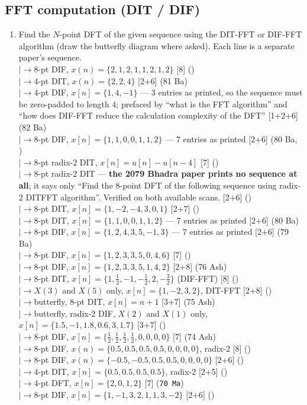 \documentclass[12pt]{article}
\newcommand{\lb}{\\$\left|\rightarrow\right.$}
\begin{document}
  \subsection{FFT computation (DIT / DIF)}
    \begin{enumerate}[topsep=0pt, noitemsep]
      \item Find the $N$-point DFT of the given sequence using the DIT-FFT or DIF-FFT algorithm (draw the butterfly diagram where asked). Each line is a separate paper's sequence.
        \lb 8-pt DIF, $x(n)=\{2,1,2,1,1,2,1,2\}$ \hfill [8] ()
        \lb 4-pt DIT, $x(n)=\{2,2,4\}$ \hfill [2+6] (81 Ba)
        \lb 4-pt DIF, $x[n]=\{1,4,-1\}$ --- 3 entries as printed, so the sequence must be zero-padded to length 4; prefaced by ``what is the FFT algorithm'' and ``how does DIF-FFT reduce the calculation complexity of the DFT'' \hfill [1+2+6] (82 Ba)
        \lb 8-pt DIF, $x[n]=\{1,1,0,0,1,1,2\}$ --- 7 entries as printed \hfill [2+6] (80 Ba, )
        \lb 8-pt radix-2 DIT, $x[n]=u[n]-u[n-4]$ \hfill [7] ()
        \lb 8-pt radix-2 DIT --- \textbf{the 2079 Bhadra paper prints no sequence at all}; it says only ``Find the 8-point DFT of the following sequence using radix-2 DITFFT algorithm''. Verified on both available scans. \hfill [2+6] ()
        \lb 8-pt DIT, $x[n]=\{1,-2,-4,3,0,1\}$ \hfill [2+7] ()
        \lb 8-pt DIT, $x[n]=\{1,1,0,0,1,1,2\}$ --- 7 entries as printed \hfill [2+6] (80 Ba)
        \lb 8-pt DIF, $x[n]=\{1,2,4,3,5,-1,3\}$ --- 7 entries as printed \hfill [2+6] (79 Ba)
        \lb 8-pt DIF, $x[n]=\{1,2,3,3,5,0,4,6\}$ \hfill [7] ()
        \lb 8-pt DIF, $x[n]=\{1,2,3,3,5,1,4,2\}$ \hfill [2+8] (76 Ash)
        \lb 8-pt DIT, $x[n]=\{1,\tfrac12,-1,-\tfrac12,2,-\tfrac32\}$ (DIF-FFT) \hfill [8] ()
        \lb $X(3)$ and $X(5)$ only, $x[n]=\{1,-2,3,2\}$, DIT-FFT \hfill [2+8] ()
        \lb butterfly, 8-pt DIT, $x[n]=n+1$ \hfill [3+7] (75 Ash)
        \lb butterfly, radix-2 DIF, $X(2)$ and $X(1)$ only, $x[n]=\{1.5,-1,1.8,0.6,3,1.7\}$ \hfill [3+7] ()
        \lb 8-pt DIF, $x[n]=\{\tfrac12,\tfrac12,\tfrac12,\tfrac12,0,0,0,0\}$ \hfill [7] (74 Ash)
        \lb 8-pt DIF, $x(n)=\{0.5,0.5,0.5,0.5,0,0,0,0\}$, radix-2 \hfill [8] ()
        \lb 8-pt DIF, $x(n)=\{-0.5,-0.5,0.5,0.5,0,0,0,0\}$ \hfill [2+6] ()
        \lb 4-pt DIT, $x[n]=\{0.5,0.5,0.5,0.5\}$, radix-2 \hfill [2+5] ()
        \lb 4-pt DFT, $x[n]=\{2,0,1,2\}$ \hfill [7] (\texttt{70 Ma})
        \lb 8-pt DIF, $x[n]=\{1,-1,3,2,1,1,3,-2\}$ \hfill [2+6] ()

\end{enumerate}
\end{document}
